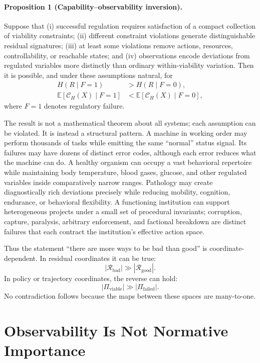 \documentclass[11pt]{article}
\newcommand{\E}{\mathbb{E}}
\newcommand{\C}{\mathcal{C}}
\begin{document}
\paragraph{Proposition 1 (Capability--observability inversion).}
Suppose that (i) successful regulation requires satisfaction of a compact collection of viability constraints; (ii) different constraint violations generate distinguishable residual signatures; (iii) at least some violations remove actions, resources, controllability, or reachable states; and (iv) observations encode deviations from regulated variables more distinctly than ordinary within-viability variation. Then it is possible, and under these assumptions natural, for
\begin{align}
    H(R\mid F=1) &> H(R\mid F=0),\\
    \E[\C_H(X)\mid F=1] &< \E[\C_H(X)\mid F=0],
\end{align}
where $F=1$ denotes regulatory failure.

The result is not a mathematical theorem about all systems; each assumption can be violated. It is instead a structural pattern. A machine in working order may perform thousands of tasks while emitting the same ``normal'' status signal. Its failures may have dozens of distinct error codes, although each error reduces what the machine can do. A healthy organism can occupy a vast behavioral repertoire while maintaining body temperature, blood gases, glucose, and other regulated variables inside comparatively narrow ranges. Pathology may create diagnostically rich deviations precisely while reducing mobility, cognition, endurance, or behavioral flexibility. A functioning institution can support heterogeneous projects under a small set of procedural invariants; corruption, capture, paralysis, arbitrary enforcement, and factional breakdown are distinct failures that each contract the institution's effective action space.

Thus the statement ``there are more ways to be bad than good'' is coordinate-dependent. In residual coordinates it can be true:
\[
    |\mathcal{R}_{\mathrm{bad}}|
    \gg
    |\mathcal{R}_{\mathrm{good}}|.
\]
In policy or trajectory coordinates, the reverse can hold:
\[
    |\Pi_{\mathrm{viable}}|
    \gg
    |\Pi_{\mathrm{failed}}|.
\]
No contradiction follows because the maps between these spaces are many-to-one.

\section{Observability Is Not Normative Importance}
\end{document}
